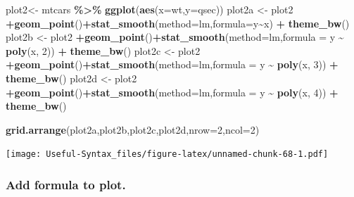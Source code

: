 \documentclass[
]{article}
\newenvironment{Shaded}{\begin{snugshade}}{\end{snugshade}}
\newcommand{\AttributeTok}[1]{\textcolor[rgb]{0.13,0.29,0.53}{#1}}
\newcommand{\DecValTok}[1]{\textcolor[rgb]{0.00,0.00,0.81}{#1}}
\newcommand{\FunctionTok}[1]{\textcolor[rgb]{0.13,0.29,0.53}{\textbf{#1}}}
\newcommand{\NormalTok}[1]{#1}
\newcommand{\OtherTok}[1]{\textcolor[rgb]{0.56,0.35,0.01}{#1}}
\newcommand{\SpecialCharTok}[1]{\textcolor[rgb]{0.81,0.36,0.00}{\textbf{#1}}}
\newcommand{\StringTok}[1]{\textcolor[rgb]{0.31,0.60,0.02}{#1}}
\begin{document}
\begin{Shaded}
\begin{Highlighting}[]
\NormalTok{plot2}\OtherTok{\textless{}{-}}\NormalTok{ mtcars }\SpecialCharTok{\%\textgreater{}\%} \FunctionTok{ggplot}\NormalTok{(}\FunctionTok{aes}\NormalTok{(}\AttributeTok{x=}\NormalTok{wt,}\AttributeTok{y=}\NormalTok{qsec))}
\NormalTok{plot2a }\OtherTok{\textless{}{-}}\NormalTok{ plot2 }\SpecialCharTok{+}\FunctionTok{geom\_point}\NormalTok{()}\SpecialCharTok{+}\FunctionTok{stat\_smooth}\NormalTok{(}\AttributeTok{method=}\StringTok{\textquotesingle{}lm\textquotesingle{}}\NormalTok{,}\AttributeTok{formula=}\NormalTok{y}\SpecialCharTok{\textasciitilde{}}\NormalTok{x) }\SpecialCharTok{+} \FunctionTok{theme\_bw}\NormalTok{()}
\NormalTok{plot2b }\OtherTok{\textless{}{-}}\NormalTok{ plot2 }\SpecialCharTok{+}\FunctionTok{geom\_point}\NormalTok{()}\SpecialCharTok{+}\FunctionTok{stat\_smooth}\NormalTok{(}\AttributeTok{method=}\StringTok{\textquotesingle{}lm\textquotesingle{}}\NormalTok{,}\AttributeTok{formula =}\NormalTok{ y }\SpecialCharTok{\textasciitilde{}} \FunctionTok{poly}\NormalTok{(x, }\DecValTok{2}\NormalTok{)) }\SpecialCharTok{+} \FunctionTok{theme\_bw}\NormalTok{()}
\NormalTok{plot2c }\OtherTok{\textless{}{-}}\NormalTok{ plot2 }\SpecialCharTok{+}\FunctionTok{geom\_point}\NormalTok{()}\SpecialCharTok{+}\FunctionTok{stat\_smooth}\NormalTok{(}\AttributeTok{method=}\StringTok{\textquotesingle{}lm\textquotesingle{}}\NormalTok{,}\AttributeTok{formula =}\NormalTok{ y }\SpecialCharTok{\textasciitilde{}} \FunctionTok{poly}\NormalTok{(x, }\DecValTok{3}\NormalTok{)) }\SpecialCharTok{+} \FunctionTok{theme\_bw}\NormalTok{()}
\NormalTok{plot2d }\OtherTok{\textless{}{-}}\NormalTok{ plot2 }\SpecialCharTok{+}\FunctionTok{geom\_point}\NormalTok{()}\SpecialCharTok{+}\FunctionTok{stat\_smooth}\NormalTok{(}\AttributeTok{method=}\StringTok{\textquotesingle{}lm\textquotesingle{}}\NormalTok{,}\AttributeTok{formula =}\NormalTok{ y }\SpecialCharTok{\textasciitilde{}} \FunctionTok{poly}\NormalTok{(x, }\DecValTok{4}\NormalTok{)) }\SpecialCharTok{+} \FunctionTok{theme\_bw}\NormalTok{()}

\FunctionTok{grid.arrange}\NormalTok{(plot2a,plot2b,plot2c,plot2d,}\AttributeTok{nrow=}\DecValTok{2}\NormalTok{,}\AttributeTok{ncol=}\DecValTok{2}\NormalTok{)}
\end{Highlighting}
\end{Shaded}

\texttt{[image: Useful-Syntax\_files/figure-latex/unnamed-chunk-68-1.pdf]}

\hypertarget{add-formula-to-plot.}{%
\subsubsection{Add formula to plot.}\label{add-formula-to-plot.}}
\end{document}
